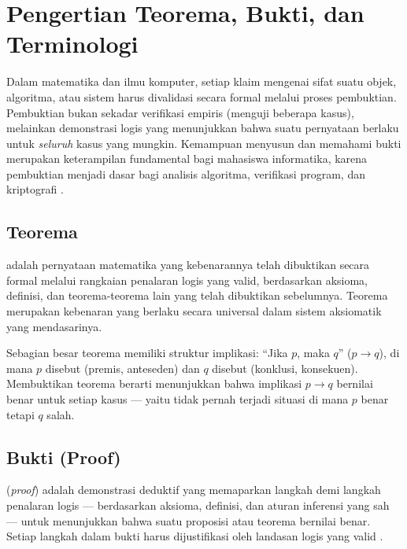 \section{Pengertian Teorema, Bukti, dan Terminologi}

Dalam matematika dan ilmu komputer, setiap klaim mengenai sifat suatu objek, algoritma, atau sistem harus divalidasi secara formal melalui proses pembuktian. Pembuktian bukan sekadar verifikasi empiris (menguji beberapa kasus), melainkan demonstrasi logis yang menunjukkan bahwa suatu pernyataan berlaku untuk \emph{seluruh} kasus yang mungkin. Kemampuan menyusun dan memahami bukti merupakan keterampilan fundamental bagi mahasiswa informatika, karena pembuktian menjadi dasar bagi analisis algoritma, verifikasi program, dan kriptografi \cite{rosen2019}.

\subsection{Teorema}

\begin{definisi}[Teorema]
 adalah pernyataan matematika yang kebenarannya telah dibuktikan secara formal melalui rangkaian penalaran logis yang valid, berdasarkan aksioma, definisi, dan teorema-teorema lain yang telah dibuktikan sebelumnya. Teorema merupakan kebenaran yang berlaku secara universal dalam sistem aksiomatik yang mendasarinya.
\end{definisi}

Sebagian besar teorema memiliki struktur implikasi: ``Jika $p$, maka $q$'' ($p \rightarrow q$), di mana $p$ disebut  (premis, anteseden) dan $q$ disebut  (konklusi, konsekuen). Membuktikan teorema berarti menunjukkan bahwa implikasi $p \rightarrow q$ bernilai benar untuk setiap kasus --- yaitu tidak pernah terjadi situasi di mana $p$ benar tetapi $q$ salah.

\subsection{Bukti (Proof)}

\begin{definisi}[Bukti]
 (\textit{proof}) adalah demonstrasi deduktif yang memaparkan langkah demi langkah penalaran logis --- berdasarkan aksioma, definisi, dan aturan inferensi yang sah --- untuk menunjukkan bahwa suatu proposisi atau teorema bernilai benar. Setiap langkah dalam bukti harus dijustifikasi oleh landasan logis yang valid \cite{velleman2019}.
\end{definisi}

